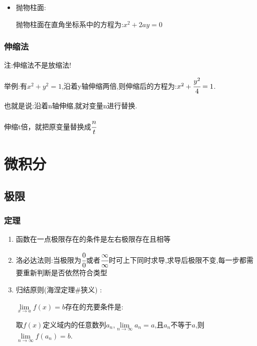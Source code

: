\documentclass[UTF8,12pt]{ctexbook}
\newcommand{\limNormal}[1]{\lim\limits_{#1}}
\newcommand{\defFunction}[1]{f(#1)}
\begin{document}
{{{{\begin{itemize}
{\begin{itemize}
{                      双曲柱面在直角坐标系中的方程为:$\cfrac{x^2}{a^2} - \cfrac{y^2}{b^2} = 1$
                      }
                \item {
                      抛物柱面:

                      抛物柱面在直角坐标系中的方程为:$x^2 + 2ay = 0$
                      }
              \end{itemize}
              }
      \end{itemize}
    }%

    \subsubsection{伸缩法}{
      注:伸缩法不是放缩法!

      举例:有$x^2 + y^2 = 1$,沿着y轴伸缩两倍,则伸缩后的方程为:$x^2 + \cfrac{y^2}{4} = 1$.

      也就是说:沿着n轴伸缩,就对变量n进行替换.

      伸缩t倍，就把原变量替换成$\cfrac{n}{t}$
    }%
  }%

 }%

\section{微积分}{

\subsection{极限}{

  \subsubsection{定理}{
    \begin{enumerate}
      \item 函数在一点极限存在的条件是左右极限存在且相等
      \item 洛必达法则:当极限为$\cfrac{0}{0}$或者$\cfrac{\infty}{\infty}$时可上下同时求导,求导后极限不变,每一步都需要重新判断是否依然符合类型
      \item {
            归结原则(海涅定理\#狭义) :

            $\limNormal{x \to a}\defFunction{x} = b$存在的充要条件是:

            取$\defFunction{x}$定义域内的任意数列${a_n}$,$\limNormal{n \to \infty}a_n = a$,且$a_n$不等于$a$,则$\limNormal{n \to \infty}\defFunction{a_n} = b$.

}
\end{enumerate}}}}}
\end{document}
